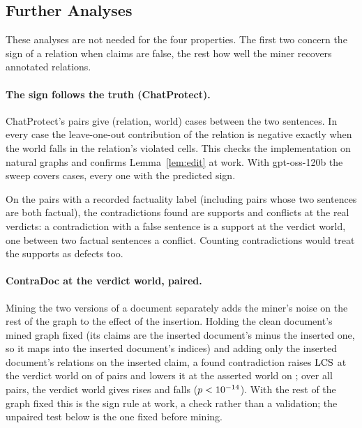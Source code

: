 \clearpage



\clearpage
\subsection{Further Analyses}
\label{app:ext-further}

These analyses are not needed for the four properties. The first two concern the sign of a
relation when claims are false, the rest how well the miner recovers annotated relations.

\paragraph{The sign follows the truth (ChatProtect).} ChatProtect's \extCpPairs{} pairs give \extCpSweepNGpt{} (relation, world) cases between the two
sentences. In every case the leave-one-out contribution of the relation is negative exactly when
the world falls in the relation's violated cells. This checks the implementation on natural
graphs and confirms Lemma~\ref{lem:edit} at work. With gpt-oss-120b the sweep covers
\extCpSweepNOss{} cases, every one with the predicted sign.

On the pairs with a recorded factuality label (including pairs whose two sentences are both
factual), the contradictions found are \extCpRealSupportGpt{} supports and \extCpRealConflictGpt{}
conflicts at the real verdicts: a contradiction with a false sentence is a support at the verdict
world, one between two factual sentences a conflict. Counting contradictions would treat the
supports as defects too.


\paragraph{ContraDoc at the verdict world, paired.} Mining the two versions of a document separately
adds the miner's noise on the rest of the graph to the effect of the insertion. Holding the clean
document's mined graph fixed (its claims are the inserted document's minus the inserted one, so it
maps into the inserted document's indices) and adding only the inserted document's relations on the
inserted claim, a found contradiction raises $\mathrm{LCS}$ at the verdict world on \extCdPvEdgeIncGpt{} of
\extCdPvEdgeNGpt{} pairs and lowers it at the asserted world on \extCdPaEdgeDecGpt; over all
\extCdPvAllNGpt{} pairs, the verdict world gives \extCdPvAllIncGpt{} rises and \extCdPvAllDecGpt{}
falls ($p<10^{-14}$). With the rest of the graph fixed this is the sign rule at work, a check
rather than a validation; the unpaired test below is the one fixed before mining.

